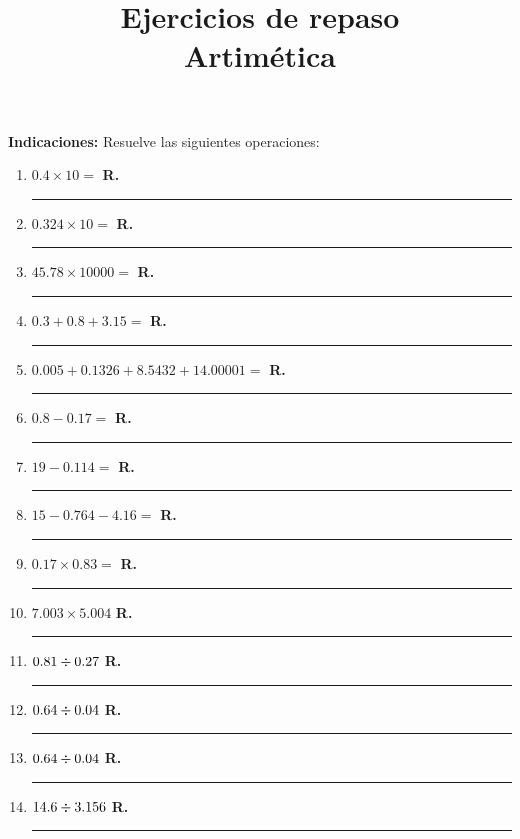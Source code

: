 

\title{Ejercicios de repaso \\ {\Large Artimética}\vspace{-3ex}}
\author{}
\date{ }



\maketitle
\fontsize{14}{14}\selectfont

\textbf{Indicaciones: } Resuelve las siguientes operaciones:

\begin{enumerate}[label=\alph*)]
\item $0.4 \times 10 =$ \hspace{0.3cm} \textbf{R.} \rule{3cm}{0.1mm}
\item $0.324 \times 10 =$ \hspace{0.3cm} \textbf{R.} \rule{3cm}{0.1mm}
\item $45.78 \times 10000 =$ \hspace{0.3cm} \textbf{R.} \rule{3cm}{0.1mm}
\item $0.3 + 0.8 + 3.15 =$ \hspace{0.3cm} \textbf{R.} \rule{3cm}{0.1mm}
\item $0.005 + 0.1326 + 8.5432 + 14.00001 =$ \hspace{0.3cm} \textbf{R.} \rule{3cm}{0.1mm}
\item $0.8 - 0.17 =$ \hspace{0.3cm} \textbf{R.} \rule{3cm}{0.1mm}
\item $19 - 0.114 =$ \hspace{0.3cm} \textbf{R.} \rule{3cm}{0.1mm}
\item $15 - 0.764 - 4.16 =$ \hspace{0.3cm} \textbf{R.} \rule{3cm}{0.1mm}
\item $0.17 \times 0.83 =$ \hspace{0.3cm} \textbf{R.} \rule{3cm}{0.1mm}
\item $7.003 \times 5.004$ \hspace{0.3cm} \textbf{R.} \rule{3cm}{0.1mm}
\item $0.81 \divisionsymbol 0.27$ \hspace{0.3cm} \textbf{R.} \rule{3cm}{0.1mm}
\item $0.64 \divisionsymbol 0.04$ \hspace{0.3cm} \textbf{R.} \rule{3cm}{0.1mm}
\item $0.64 \divisionsymbol 0.04$ \hspace{0.3cm} \textbf{R.} \rule{3cm}{0.1mm}
\item $14.6 \divisionsymbol 3.156$ \hspace{0.3cm} \textbf{R.} \rule{3cm}{0.1mm}
\end{enumerate}


